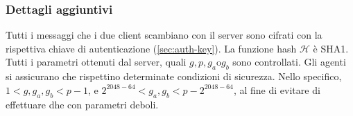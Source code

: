 \subsubsection{Dettagli aggiuntivi}
Tutti i messaggi che i due client scambiano con il server sono cifrati con la rispettiva chiave di autenticazione (\autoref{sec:auth-key}).
La funzione hash $\mathcal{H}$ è SHA1.
Tutti i parametri ottenuti dal server, quali $g, p, g_a \text{o} g_b$ sono controllati. Gli agenti si assicurano che rispettino determinate condizioni di sicurezza.
Nello specifico, $1 < g, g_a, g_b < p - 1$, e $2^{2048-64} < g_a, g_b < p - 2^{2048-64}$, al fine di evitare di effettuare \gls{dhe} con parametri deboli. \\



